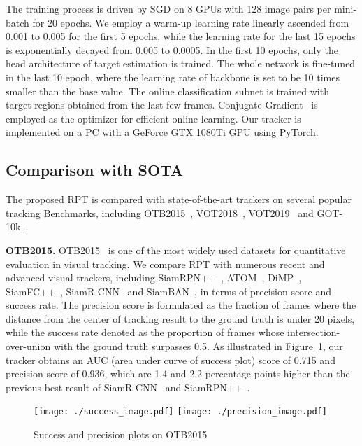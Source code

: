 \documentclass[runningheads]{llncs}
\begin{document}
The training process is driven by SGD on 8 GPUs with 128
image pairs per mini-batch for 20 epochs. We employ a warm-up learning
rate linearly ascended from 0.001 to 0.005 for the first 5 epochs, while
the learning rate for the last 15 epochs is exponentially decayed from
0.005 to 0.0005. In the first 10 epochs, only the head architecture of
target estimation is trained. The whole network is fine-tuned in the
last 10 epoch, where the learning rate of backbone is set to be 10 times
smaller than the base value. The online classification subnet is trained
with target regions obtained from the last few frames. Conjugate
Gradient~\cite{atom} is employed as the optimizer for efficient online learning. Our
tracker is implemented on a PC with a GeForce GTX 1080Ti GPU using
PyTorch.

\subsection{Comparison with SOTA}
The proposed RPT is compared with state-of-the-art trackers on several
popular tracking Benchmarks, including OTB2015~\cite{OTB2015}, VOT2018~\cite{VOT2018}, VOT2019~\cite{VOT2019} and
GOT-10k~\cite{GOT-10k}.

\textbf{OTB2015.} OTB2015~\cite{OTB2015} is one of the most widely used datasets for
quantitative evaluation in visual tracking. We compare RPT with numerous
recent and advanced visual trackers, including SiamRPN++~\cite{siamrpn++}, ATOM~\cite{atom}, DiMP~\cite{dimp},
SiamFC++~\cite{siamfc++}, SiamR-CNN~\cite{siamrcnn} and SiamBAN~\cite{siamban}, in terms of precision score and success
rate. The precision score is formulated as the fraction of frames where
the distance from the center of tracking result to the ground truth is
under 20 pixels, while the success rate denoted as the proportion of
frames whose intersection-over-union with the ground truth surpasses
0.5. As illustrated in Figure~\ref{fig:OTBresults}, our tracker obtains an AUC (area under
curve of success plot) score of 0.715 and precision score of 0.936,
which are 1.4 and 2.2 percentage points higher than the previous best
result of SiamR-CNN~\cite{siamrcnn} and SiamRPN++~\cite{siamrpn++}.

\begin{figure}[t]
\centering
\texttt{[image: ./success\_image.pdf]}
\texttt{[image: ./precision\_image.pdf]}
\caption{Success and precision plots on OTB2015}
\label{fig:OTBresults}
\end{figure}
\end{document}
